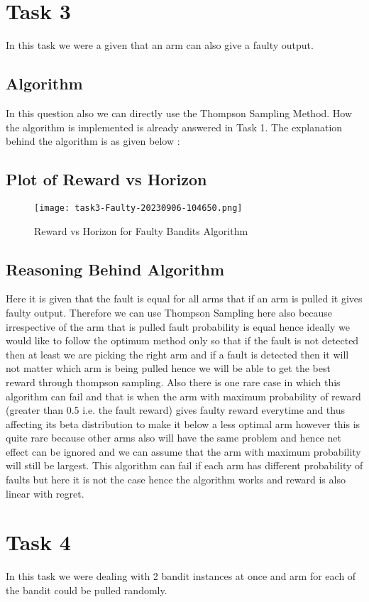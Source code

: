 \documentclass{article}
\begin{document}
\section{Task 3}
In this task we were a given that an arm can also give a faulty output.

\subsection{Algorithm}
In this question also we can directly use the Thompson Sampling Method. How the algorithm is implemented is already answered in Task 1. The explanation behind the algorithm is as given below :

\subsection{Plot of Reward vs Horizon}
\begin{figure}[H]
\centering
\texttt{[image: task3-Faulty-20230906-104650.png]}
\caption{Reward vs Horizon for Faulty Bandits Algorithm}
\end{figure}

\subsection{Reasoning Behind Algorithm}
Here it is given that the fault is equal for all arms that if an arm is pulled it gives faulty output. Therefore we can use Thompson Sampling here also because irrespective of the arm that is pulled fault probability is equal hence ideally we would like to follow the optimum method only so that if the fault is not detected then at least we are picking the right arm and if a fault is detected then it will not matter which arm is being pulled hence we will be able to get the best reward through thompson sampling. Also there is one rare case in which this algorithm can fail and that is when the arm with maximum probability of reward (greater than 0.5 i.e. the fault reward) gives faulty reward everytime and thus affecting its beta distribution to make it below a less optimal arm however this is quite rare because other arms also will have the same problem and hence net effect can be ignored and we can assume that the arm with maximum probability will still be largest. This algorithm can fail if each arm has different probability of faults but here it is not the case hence the algorithm works and reward is also linear with regret. 

\section{Task 4}
In this task we were dealing with 2 bandit instances at once and arm for each of the bandit could be pulled randomly.
\end{document}
